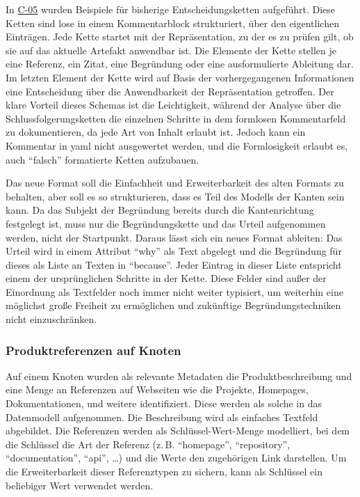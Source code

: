 In \hyperref[subsec:c-05-reason-not-good-enough]{C-05} wurden Beispiele für bisherige Entscheidungsketten aufgeführt.
Diese Ketten sind lose in einem Kommentarblock strukturiert, über den eigentlichen Einträgen.
Jede Kette startet mit der Repräsentation, zu der es zu prüfen gilt, ob sie auf das aktuelle Artefakt anwendbar ist.
Die Elemente der Kette stellen je eine Referenz, ein Zitat, eine Begründung oder eine ausformulierte Ableitung dar.
Im letzten Element der Kette wird auf Basis der vorhergegangenen Informationen eine Entscheidung über die Anwendbarkeit der Repräsentation getroffen.
Der klare Vorteil dieses Schemas ist die Leichtigkeit, während der Analyse über die Schlussfolgerungsketten die einzelnen Schritte in dem formlosen Kommentarfeld zu dokumentieren, da jede Art von Inhalt erlaubt ist.
Jedoch kann ein Kommentar in \acrshort{yaml} nicht ausgewertet werden, und die Formlosigkeit erlaubt es, auch \enquote{falsch} formatierte Ketten aufzubauen.

Das neue Format soll die Einfachheit und Erweiterbarkeit des alten Formats zu behalten, aber soll es so strukturieren, dass es Teil des Modells der Kanten sein kann.
Da das Subjekt der Begründung bereits durch die Kantenrichtung festgelegt ist, muss nur die Begründungskette und das Urteil aufgenommen werden, nicht der Startpunkt.
Daraus lässt sich ein neues Format ableiten:
Das Urteil wird in einem Attribut \enquote{why} als Text abgelegt und die Begründung für dieses als Liste an Texten in \enquote{because}.
Jeder Eintrag in dieser Liste entspricht einem der ursprünglichen Schritte in der Kette.
Diese Felder sind außer der Einordnung als Textfelder noch immer nicht weiter typisiert, um weiterhin eine möglichst große Freiheit zu ermöglichen und zukünftige Begründungstechniken nicht einzuschränken.

\subsubsection{Produktreferenzen auf Knoten}

Auf einem Knoten wurden als relevante Metadaten die Produktbeschreibung und eine Menge an Referenzen auf Webseiten wie die Projekte, Homepages, Dokumentationen, und weitere identifiziert.
Diese werden als solche in das Datenmodell aufgenommen.
Die Beschreibung wird als einfaches Textfeld abgebildet.
Die Referenzen werden als Schlüssel-Wert-Menge modelliert, bei dem die Schlüssel die Art der Referenz (z.\,B. \enquote{homepage}, \enquote{repository}, \enquote{documentation}, \enquote{api}, \ldots) und die Werte den zugehörigen Link darstellen.
Um die Erweiterbarkeit dieser Referenztypen zu sichern, kann als Schlüssel ein beliebiger Wert verwendet werden.

